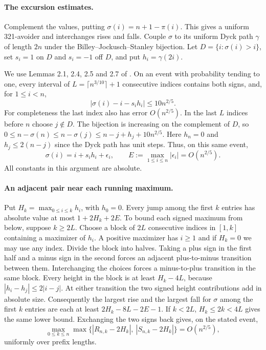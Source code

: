 \documentclass[11pt]{article}
\begin{document}
\paragraph{The excursion estimates.}
Complement the values, putting $\sigma(i)=n+1-\pi(i)$. This gives a uniform 321-avoider and interchanges rises and falls. Couple $\sigma$ to its uniform Dyck path $\gamma$ of length $2n$ under the Billey--Jockusch--Stanley bijection. Let $D=\{i:\sigma(i)>i\}$, set $s_i=1$ on $D$ and $s_i=-1$ off $D$, and put $h_i=\gamma(2i)$.

We use Lemmas 2.1, 2.4, 2.5 and 2.7 of \cite{hrs}. On an event with probability tending to one, every interval of $L=\lceil n^{3/10}\rceil+1$ consecutive indices contains both signs, and, for $1\le i<n$,
\[
 |\sigma(i)-i-s_i h_i|\le 10n^{2/5}.
\]
For completeness the last index also has error $O(n^{2/5})$. In the last $L$ indices before $n$ choose $j\notin D$. The bijection is increasing on the complement of $D$, so $0\le n-\sigma(n)\le n-\sigma(j)\le n-j+h_j+10n^{2/5}$. Here $h_n=0$ and $h_j\le2(n-j)$ since the Dyck path has unit steps. Thus, on this same event,
\[
 \sigma(i)=i+s_i h_i+\epsilon_i,\qquad
 E:=\max_{1\le i\le n}|\epsilon_i|=O(n^{2/5}).
\]
All constants in this argument are absolute.

\paragraph{An adjacent pair near each running maximum.}
Put $H_k=\max_{0\le i\le k}h_i$, with $h_0=0$. Every jump among the first $k$ entries has absolute value at most $1+2H_k+2E$. To bound each signed maximum from below, suppose $k\ge2L$. Choose a block of $2L$ consecutive indices in $[1,k]$ containing a maximizer of $h_i$. A positive maximizer has $i\ge1$ and if $H_k=0$ we may use any index. Divide the block into halves. Taking a plus sign in the first half and a minus sign in the second forces an adjacent plus-to-minus transition between them. Interchanging the choices forces a minus-to-plus transition in the same block. Every height in the block is at least $H_k-4L$, because $|h_i-h_j|\le2|i-j|$. At either transition the two signed height contributions add in absolute size. Consequently the largest rise and the largest fall for $\sigma$ among the first $k$ entries are each at least $2H_k-8L-2E-1$. If $k<2L$, $H_k\le2k<4L$ gives the same lower bound. Exchanging the two signs back gives, on the stated event,
\[
 \max_{0\le k\le n}\max\{|R_{n,k}-2H_k|,\ |S_{n,k}-2H_k|\}
 =O(n^{2/5}),
\]
uniformly over prefix lengths.
\end{document}
